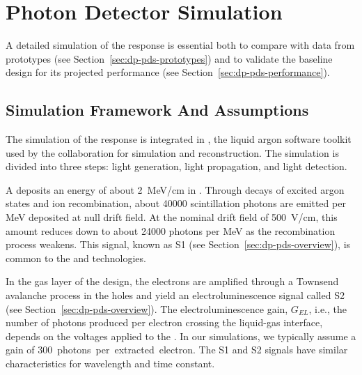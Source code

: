 \section{Photon Detector Simulation}
\label{sec:dp-pds-simulation}

A detailed simulation of the  response is essential both to compare with data from  prototypes (see Section~\ref{sec:dp-pds-prototypes}) and to validate the  baseline design for its projected performance (see Section~\ref{sec:dp-pds-performance}).


\subsection{Simulation Framework And Assumptions}
\label{subsec:dp-pds-simulation_assumptions}

The simulation of the  response is integrated in , the liquid argon software toolkit used by the \dune collaboration for simulation and reconstruction. The simulation is divided into three steps: light generation, light propagation, and light detection.

A  deposits an energy of about \SI{2}{\MeV/\cm} in . Through decays of excited argon states and ion recombination, about \num{40000} scintillation photons are emitted per \si{\MeV} deposited at null drift field. At the nominal drift field of \SI{500}{\V/\cm}, this amount reduces down to about \num{24000} photons per \si{\MeV} as the recombination process weakens. This signal, known as S1 (see Section~\ref{sec:dp-pds-overview}), is common to the  and  technologies.

In the gas layer of the  design, the electrons are amplified through a Townsend avalanche process in the  holes and %
yield an electroluminescence signal called S2 (see Section~\ref{sec:dp-pds-overview}). The electroluminescence gain, $G_{EL}$, i.e., the number of photons produced per electron crossing the liquid-gas interface, depends on the voltages applied to the . In our simulations, we typically assume a gain of \SI{300}{photons per extracted electron}. The S1 and S2 signals have similar characteristics for wavelength and time constant. %

